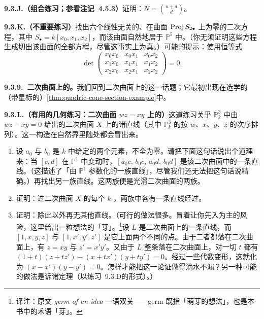 \textbf{9.3.J.（组合练习；参看注记~4.5.3）}\quad 证明：$N=\binom{n+d}{d}$。

\textbf{9.3.K.（不重要练习）}\quad 找出六个线性无关的、在\trVeronese{}曲面 $\operatorname{Proj} S_{2\bullet}$ 上为零的二次方程，其中 $S_\bullet=k[x_0,x_1,x_2]$，而该曲面自然地居于 $\mathbb{P}^5$ 中。（你无须证明这些方程生成切出该\trVeronese{}曲面的全部方程，尽管这事实上为真。）可能的提示：使用恒等式
\[
\det\begin{pmatrix}
x_0x_0 & x_0x_1 & x_0x_2\\
x_1x_0 & x_1x_1 & x_1x_2\\
x_2x_0 & x_2x_1 & x_2x_2
\end{pmatrix}=0.
\]

\textbf{9.3.9.\ 二次曲面上的\trRuling。}\quad 我们回到二次曲面上的\trRuling{}这一话题；它最初出现在选学的（带星标的）\cref{thm:quadric-cone-section-example}中。

\textbf{9.3.L.（有用的几何练习：二次曲面 $wz=xy$ 上的\trRuling）}\quad 这道练习关乎 $\mathbb{P}^3_k$ 中由 $wz-xy=0$ 给出的二次曲面 $X$ 上的诸直线（其中 $\mathbb{P}^3_k$ 的\trProjective\trCoordinate{}按 $w$、$x$、$y$、$z$ 的次序排列）。这一构造在自然界里随处都会冒出来。
\begin{enumerate}[label=(\alph*)]
  \item 设 $a_0$ 与 $b_0$ 是 $k$ 中给定的两个元素，不全为零。请把下面这句话说出个道理来：当 $[c,d]$ 在 $\mathbb{P}^1$ 中变动时，$[a_0c,\,b_0c,\,a_0d,\,b_0d]$ 是该二次曲面中的一条直线。（这描述了「由 $\mathbb{P}^1$ 参数化的一族直线」，尽管我们还无法把这句话说精确。）再找出另一族直线。这两族便是光滑二次曲面的两族\trRuling。
  \item 证明：过二次曲面 $X$ 的每个 $k$-\trValuedPoint，两族\trRuling{}中各有一条直线经过。
  \item 证明：除此以外再无其他直线。（可行的做法很多。冒着让你先入为主的风险，这里给出一粒想法的「芽」。\footnote{译注：原文 \emph{germ of an idea} 一语双关——germ 既指「萌芽的想法」，也是本书中的术语「芽」。}设 $L$ 是二次曲面上的一条直线，而 $[1,x,y,z]$ 与 $[1,x',y',z']$ 是它上面两个不同的点。由于二者都落在二次曲面上，有 $z=xy$ 与 $z'=x'y'$。又由于 $L$ 整条落在二次曲面上，对一切 $t$ 都有 $(1+t)(z+tz')-(x+tx')(y+ty')=0$。经过一些代数变形，这就化为 $(x-x')(y-y')=0$。怎样才能把这一论证做得滴水不漏？另一种可能的做法是诉诸\trBezout{}定理（以\mbox{练习~9.3.D}的形式）。）
\end{enumerate}

